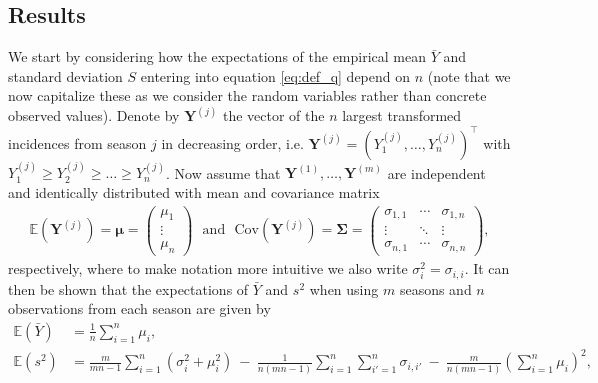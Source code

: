 \documentclass{article}
\newcommand{\sd}{s}
\newcommand{\mean}{\bar{Y}}
\begin{document}
\subsection{Results}

We start by considering how the expectations of the empirical mean $\bar{Y}$ and standard deviation $S$ entering into equation \eqref{eq:def_q} depend on $n$ (note that we now capitalize these as we consider the random variables rather than concrete observed values). Denote by $\mathbf{Y}^{(j)}$ the vector of the $n$ largest transformed incidences from season $j$ in decreasing order, i.e. $\mathbf{Y}^{(j)} = (Y^{(j)}_1, \dots, Y^{(j)}_n)^\top$ with $Y^{(j)}_1 \geq Y^{(j)}_2 \geq \dots \geq Y^{(j)}_n$. Now assume that $\mathbf{Y}^{(1)}, \dots, \mathbf{Y}^{(m)}$ are independent and identically distributed with mean and covariance matrix
\begin{align}
\mathbb{E}\left(\mathbf{Y}^{(j)}\right) = \boldsymbol{\mu} = \left(\begin{array}{c}
\mu_1\\
\vdots\\
\mu_n
\end{array}\right) \ \ \ \text{and} \ \ \ \text{Cov}\left(\mathbf{Y}^{(j)}\right) = \boldsymbol{\Sigma} =
\left(\begin{array}{ccc}
\sigma_{1, 1} & \cdots & \sigma_{1, n}\\
\vdots & \ddots &\vdots\\
\sigma_{n, 1} & \cdots & \sigma_{n, n}
\end{array}\right),
\end{align}
respectively, where to make notation more intuitive we also write $\sigma^2_i = \sigma_{i, i}$. It can then be shown that the expectations of $\mean$ and $\sd^2$ when using $m$ seasons and $n$ observations from each season are given by
\begin{align}
\mathbb{E}(\mean) & = \frac{1}{n} \sum_{i = 1}^n \mu_i,
\label{eq:expectation_mu}\\
\mathbb{E}(\sd^2) & = \frac{m}{mn - 1} \sum_{i = 1}^n (\sigma_{i}^2 + \mu_i^2) \ - \ \frac{1}{n(mn - 1)} \sum_{i = 1}^n \sum_{i' = 1}^n \sigma_{i,i'} \ - \ \frac{m}{n(mn - 1)}\left(\sum_{i = 1}^n \mu_i\right)^2,
\label{eq:expectation_sigma2}
\end{align}
\end{document}
